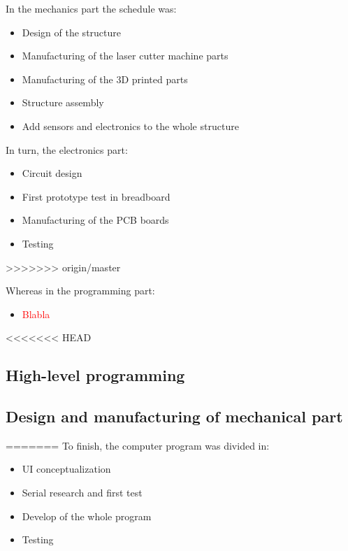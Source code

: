		In the mechanics part the schedule was:
		\begin{itemize}
			\item Design of the structure
			\item Manufacturing of the laser cutter machine parts
			\item Manufacturing of the 3D printed parts
			\item Structure assembly
			\item Add sensors and electronics to the whole structure
		\end{itemize}

		In turn, the electronics part:
		\begin{itemize}
			\item Circuit design
			\item First prototype test in breadboard
			\item Manufacturing of the PCB boards
			\item Testing
		\end{itemize}
>>>>>>> origin/master

		Whereas in the programming part:
		\begin{itemize}
			\item \textcolor{red}{Blabla}
		\end{itemize}

<<<<<<< HEAD
\subsection{High-level programming}


\subsection{Design and manufacturing of mechanical part}
=======
		To finish, the computer program was divided in:
		\begin{itemize}
			\item UI conceptualization
			\item Serial research and first test
			\item Develop of the whole program
			\item Testing
		\end{itemize}

